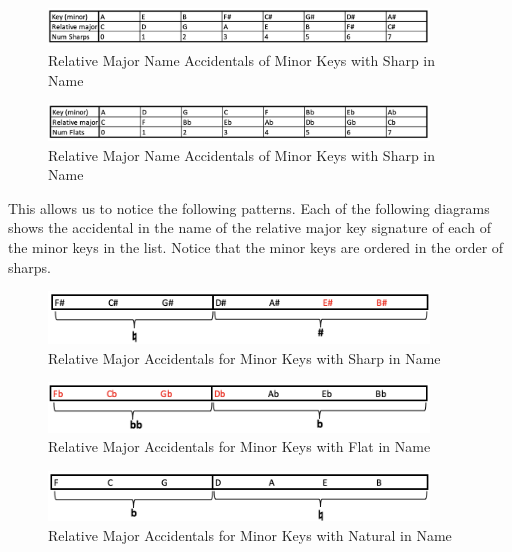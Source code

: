 \documentclass{report}
\begin{document}
\begin{figure}[h!]
\centering
\includegraphics[width=0.9\textwidth]{images/minor_sharp}
\caption{Relative Major Name Accidentals of Minor Keys with Sharp in Name}
\label{minor_sharp}
\end{figure}


\begin{figure}[h!]
\centering
\includegraphics[width=0.9\textwidth]{images/minor_flat}
\caption{Relative Major Name Accidentals of Minor Keys with Sharp in Name}
\label{minor_flat}
\end{figure}
\newpage

This allows us to notice the following patterns. Each of the following diagrams shows the accidental in the name of the relative major key signature of each of the minor keys in the list. Notice that the minor keys are ordered in the order of sharps. 

\begin{figure}[h!]
\centering
\includegraphics[width=0.9\textwidth]{images/sharp_min_to_maj}
\caption{Relative Major Accidentals for Minor Keys with Sharp in Name}
\label{major_sharp}
\end{figure}

\begin{figure}[h!]
\centering
\includegraphics[width=0.9\textwidth]{images/flat_min_to_maj}
\caption{Relative Major Accidentals for Minor Keys with Flat in Name}
\label{major_flat}
\end{figure}

\begin{figure}[h!]
\centering
\includegraphics[width=0.9\textwidth]{images/natural_min_to_maj}
\caption{Relative Major Accidentals for Minor Keys with Natural in Name}
\label{major_flat}
\end{figure}
\end{document}
